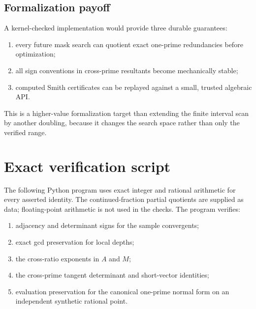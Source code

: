 \documentclass[11pt,oneside]{article}
\theoremstyle{definition}
\theoremstyle{remark}
\begin{document}
\subsection{Formalization payoff}

A kernel-checked implementation would provide three durable guarantees:
\begin{enumerate}
\item every future mask search can quotient exact one-prime redundancies before optimization;
\item all sign conventions in cross-prime resultants become mechanically stable;
\item computed Smith certificates can be replayed against a small, trusted algebraic API.
\end{enumerate}
This is a higher-value formalization target than extending the finite interval scan by another
doubling, because it changes the search space rather than only the verified range.

\section{Exact verification script}
\label{sec:script}

The following Python program uses exact integer and rational arithmetic for every asserted
identity.  The continued-fraction partial quotients are supplied as data; floating-point
arithmetic is not used in the checks.  The program verifies:
\begin{enumerate}
\item adjacency and determinant signs for the sample convergents;
\item exact gcd preservation for local depths;
\item the cross-ratio exponents in $A$ and $M$;
\item the cross-prime tangent determinant and short-vector identities;
\item evaluation preservation for the canonical one-prime normal form on an independent
synthetic rational point.
\end{enumerate}
\end{document}
